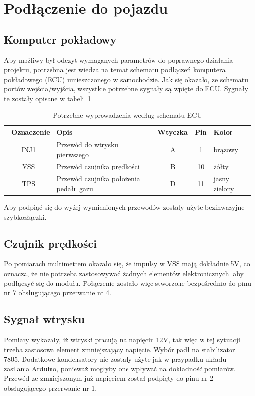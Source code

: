 \section{Podłączenie do pojazdu}
\subsection{Komputer pokładowy}
Aby możliwy był odczyt wymaganych parametrów do poprawnego działania projektu, potrzebna jest wiedza na temat schematu podłączeń komputera pokładowego (ECU) umieszczonego w samochodzie. Jak się okazało, ze schematu portów wejścia/wyjścia\cite{HondaPinout}, wszystkie potrzebne sygnały są wpięte do ECU. Sygnały te zostały opisane w tabeli~\ref{tab:ecu_pinout}

\begin{table}[htb] \small
\centering
\caption{Potrzebne wyprowadzenia według schematu ECU\cite{HondaPinout}}
\label{tab:ecu_pinout}
\begin{tabularx}{\linewidth}{|c|p{7cm}|c|c|X|} \hline\
\textbf{Oznaczenie} & \textbf{Opis} & \textbf{Wtyczka} &\textbf{ Pin} & \textbf{Kolor} \\ 
\hline
INJ1 & Przewód do wtrysku pierwszego & A & 1 & brązowy\\
\hline
VSS & Przewód czujnika prędkości & B & 10 & żółty\\
\hline
TPS & Przewód czujnika położenia pedału gazu & D & 11 & jasny zielony\\
\hline
\end{tabularx}
\end{table}

Aby podpiąć się do wyżej wymienionych przewodów zostały użyte bezinwazyjne szybkozłączki. 

\subsection{Czujnik prędkości}
Po pomiarach multimetrem okazało się, że impulsy w VSS mają dokładnie 5V, co oznacza, że nie potrzeba zastosowywać żadnych elementów elektronicznych, aby podłączyć się do modułu. Połączenie zostało więc stworzone bezpośrednio do pinu nr 7 obsługującego przerwanie nr 4.

\subsection{Sygnał wtrysku}
Pomiary wykazały, iż wtryski pracują na napięciu 12V, tak więc w tej sytuacji trzeba zastosowa element zmniejszający napięcie. Wybór padł na stabilizator 7805. Dodatkowe kondensatory nie zostały użyte jak w przypadku układu zasilania Arduino, ponieważ mogłyby one wpływać na dokładność pomiarów. Przewód ze zmniejszonym już napięciem został podpięty do pinu nr 2 obsługującego przerwanie nr 1.

